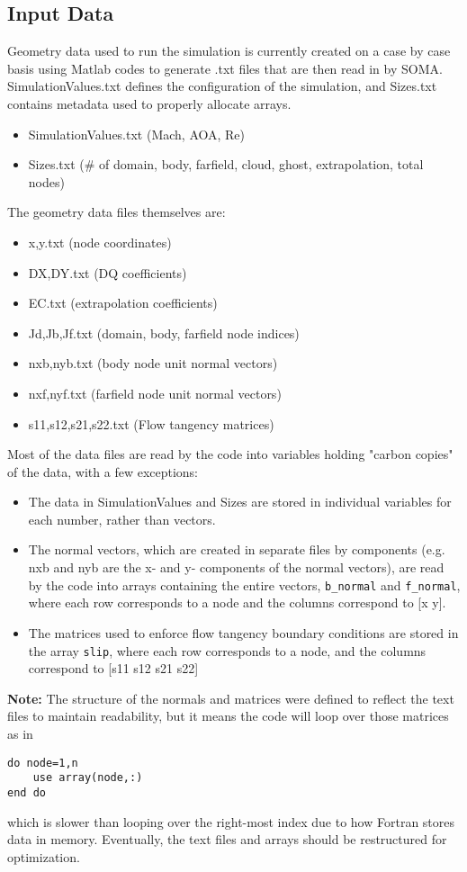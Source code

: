 \documentclass[12pt]{article}
\begin{document}
    \subsection{Input Data}
        Geometry data used to run the simulation is currently created on a case by case basis using Matlab codes to generate .txt files that are then read in by SOMA. SimulationValues.txt defines the configuration of the simulation, and Sizes.txt contains metadata used to properly allocate arrays.
        \begin{itemize}
            \item SimulationValues.txt (Mach, AOA, Re)
            \item Sizes.txt (\# of domain, body, farfield, cloud, ghost, extrapolation, total nodes)
        \end{itemize}
        The geometry data files themselves are:
        \begin{itemize}
            \item x,y.txt (node coordinates)
            \item DX,DY.txt (DQ coefficients)
            \item EC.txt (extrapolation coefficients)
            \item Jd,Jb,Jf.txt (domain, body, farfield node indices)
            \item nxb,nyb.txt (body node unit normal vectors)
            \item nxf,nyf.txt (farfield node unit normal vectors)
            \item s11,s12,s21,s22.txt (Flow tangency matrices)
        \end{itemize}

        Most of the data files are read by the code into variables holding "carbon copies" of the data, with a few exceptions:
        \begin{itemize}
            \item The data in SimulationValues and Sizes are stored in individual variables for each number, rather than vectors.
            \item The normal vectors, which are created in separate files by components (e.g. nxb and nyb are the x- and y- components of the normal vectors), are read by the code into arrays containing the entire vectors, \texttt{b\_normal} and \texttt{f\_normal}, where each row corresponds to a node and the columns correspond to [x y].
            \item The matrices used to enforce flow tangency boundary conditions are stored in the array \texttt{slip}, where each row corresponds to a node, and the columns correspond to [s11 s12 s21 s22]
        \end{itemize}
        \textbf{Note:} The structure of the normals and matrices were defined to reflect the text files to maintain readability, but it means the code will loop over those matrices as in
        \begin{verbatim}
do node=1,n
    use array(node,:)
end do
        \end{verbatim}
        which is slower than looping over the right-most index due to how Fortran stores data in memory. Eventually, the text files and arrays should be restructured for optimization.
\end{document}
